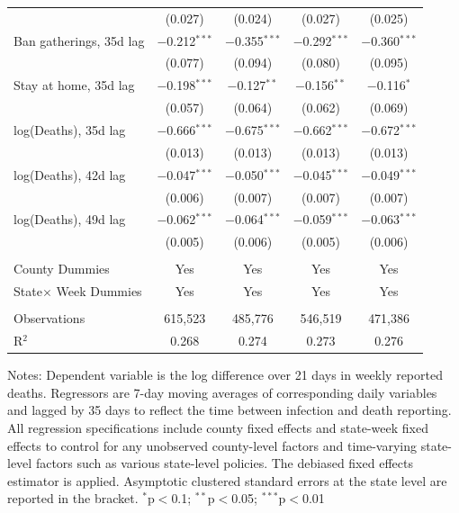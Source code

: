\documentclass[9pt,twoside,lineno]{pnas-new}
\theoremstyle{definition}
\begin{document}
\begin{table}[!htbp]
{\begin{tabular}{@{\extracolsep{1pt}}lcc|cc}
  & (0.027) & (0.024) & (0.027) & (0.025) \\ 
  Ban gatherings,  35d lag & $-$0.212$^{***}$ & $-$0.355$^{***}$ & $-$0.292$^{***}$ & $-$0.360$^{***}$ \\ 
  & (0.077) & (0.094) & (0.080) & (0.095) \\ 
  Stay at home,   35d lag  & $-$0.198$^{***}$ & $-$0.127$^{**}$ & $-$0.156$^{**}$ & $-$0.116$^{*}$ \\ 
  & (0.057) & (0.064) & (0.062) & (0.069) \\  \hline
  log(Deaths), 35d lag& $-$0.666$^{***}$ & $-$0.675$^{***}$ & $-$0.662$^{***}$ & $-$0.672$^{***}$ \\ 
  & (0.013) & (0.013) & (0.013) & (0.013) \\ 
 log(Deaths), 42d lag & $-$0.047$^{***}$ & $-$0.050$^{***}$ & $-$0.045$^{***}$ & $-$0.049$^{***}$ \\ 
  & (0.006) & (0.007) & (0.007) & (0.007) \\ 
  log(Deaths), 49d lag & $-$0.062$^{***}$ & $-$0.064$^{***}$ & $-$0.059$^{***}$ & $-$0.063$^{***}$ \\ 
  & (0.005) & (0.006) & (0.005) & (0.006) \\ 
 \hline \\[-1.8ex] 
County Dummies & Yes & Yes &  Yes  &  Yes  \\   
State$\times$ Week Dummies&Yes & Yes &  Yes  &  Yes  \\ 
\hline \\[-1.8ex] 
Observations & 615,523 & 485,776 & 546,519 & 471,386 \\ 
R$^{2}$ & 0.268 & 0.274 & 0.273 & 0.276 \\    \hline 
\hline %
\end{tabular}}	
  {\scriptsize
\begin{flushleft}
Notes: Dependent variable is the log difference over 21 days in weekly reported deaths. Regressors are 7-day moving averages of corresponding daily variables and lagged by 35 days to reflect the time between infection and  death reporting. All regression specifications include county fixed effects and state-week fixed effects to control for any unobserved county-level factors and time-varying state-level factors such as various state-level policies. 
The debiased fixed effects estimator is applied.  Asymptotic clustered standard errors at the state level are reported in the bracket.  {$^{*}$p$<$0.1; $^{**}$p$<$0.05; $^{***}$p$<$0.01}
\end{flushleft}}   
\end{table} 
\end{document}
